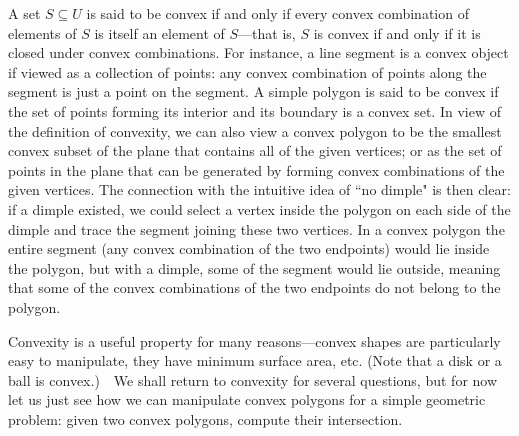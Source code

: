 \documentclass[11pt]{article}
\begin{document}
A set $S\subseteq U$ is said to be convex if and only if every convex
combination of elements of $S$ is itself an element of $S$---that is,
$S$ is convex if and only if it is closed under convex combinations.
For instance, a line segment is a convex object if viewed as a collection
of points: any convex combination of points along the segment is just
a point on the segment.
A simple polygon is said to be convex if the set of points forming its
interior and its boundary is a convex set.  In view of the definition
of convexity, we can also view a convex polygon to be the smallest convex
subset of the plane that contains all of the given vertices; or as the
set of points in the plane that can be generated by forming convex
combinations of the given vertices.  The connection with the intuitive idea
of ``no dimple" is then clear: if a dimple existed, we could select
a vertex inside the polygon on each side of the dimple and trace the segment
joining these two vertices.  In a convex polygon the entire segment (any
convex combination of the two endpoints) would lie inside the polygon, but
with a dimple, some of the segment would lie outside, meaning that some of
the convex combinations of the two endpoints do not belong to the polygon.

Convexity is a useful property for many reasons---convex shapes are
particularly easy to manipulate, they have minimum surface area, etc.
(Note that a disk or a ball is convex.)\ \ We shall return to convexity
for several questions, but for now let us just see how we can manipulate
convex polygons for a simple geometric problem: given two convex polygons,
compute their intersection.
\end{document}
